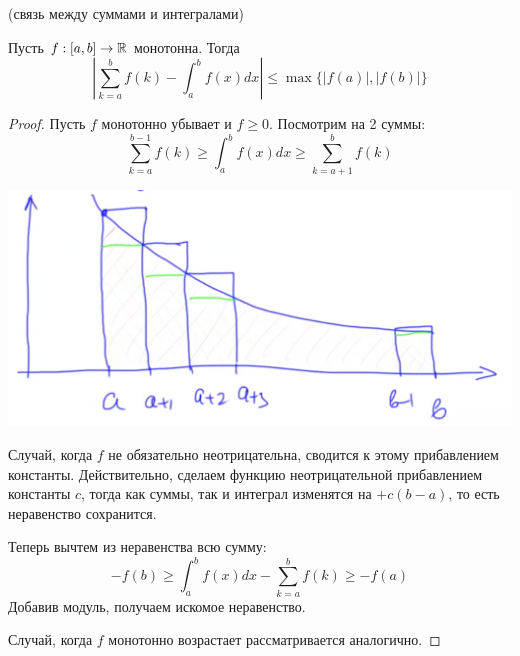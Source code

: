 \vspace{6mm}

\begin{theorem} (связь между суммами и интегралами)

    \quad Пусть $f: [a, b] \to \mathbb{R}$ монотонна. Тогда \[ \left| \sum_{k = a}^b f(k) - \int_a^b f(x)dx \right| \leqslant \max\{|f(a)|, |f(b)| \}\] 
\end{theorem}
\begin{proof}
    Пусть $f$ монотонно убывает и $f \geqslant 0$.
    Посмотрим на 2 суммы: \[ \sum\limits_{k = a}^{b-1} f(k) \geqslant \int_a^b f(x)dx \geqslant \sum\limits_{k = a + 1}^b f(k) \]
    \begin{center}
        \includegraphics[scale=0.5]{images/lec5_pic1.png}
    \end{center}
    \quad Случай, когда $f$ не обязательно неотрицательна, сводится к этому прибавлением константы.
    Действительно, сделаем функцию неотрицательной прибавлением константы $c$, тогда как суммы, так и интеграл изменятся на $+c(b - a)$, то есть неравенство сохранится.

    \quad Теперь вычтем из неравенства всю сумму: \[ -f(b) \geqslant \int_a^b f(x)dx - \sum\limits_{k = a}^b f(k) \geqslant -f(a) \]
    \quad Добавив модуль, получаем искомое неравенство.

    \quad Случай, когда $f$ монотонно возрастает рассматривается аналогично.
\end{proof}

\vspace{6mm}

